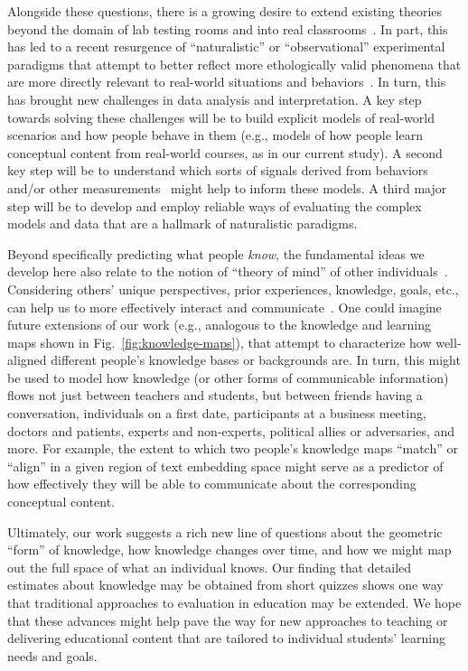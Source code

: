\documentclass[10pt]{article}
\begin{document}
Alongside these questions, there is a growing desire to extend existing
theories beyond the domain of lab testing rooms and into real
classrooms~\citep{Kauf03}. In part, this has led to a recent resurgence of
``naturalistic'' or ``observational'' experimental paradigms that attempt to
better reflect more ethologically valid phenomena that are more directly
relevant to real-world situations and behaviors~\citep{NastEtal20}. In turn,
this has brought new challenges in data analysis and interpretation. A key step
towards solving these challenges will be to build explicit models of real-world
scenarios and how people behave in them (e.g., models of how people learn
conceptual content from real-world courses, as in our current study). A second
key step will be to understand which sorts of signals derived from behaviors
and/or other measurements~\citep[e.g., neurophysiological data; ][]{NguyEtal22,
MeshEtal20, PoulEtal17, BeviEtal19, DikkEtal17} might help to inform these
models. A third major step will be to develop and employ reliable ways of
evaluating the complex models and data that are a hallmark of naturalistic
paradigms.

Beyond specifically predicting what people \textit{know}, the fundamental ideas
we develop here also relate to the notion of ``theory of mind'' of other
individuals~\citep{GoldWinn12, KansEtal15, Melt11}. Considering others' unique
perspectives, prior experiences, knowledge, goals, etc., can help us to more
effectively interact and communicate~\citep{ShaoEtal18, StepBaer06, Ratk18}.
One could imagine future extensions of our work (e.g., analogous to the
knowledge and learning maps shown in Fig.~\ref{fig:knowledge-maps}), that
attempt to characterize how well-aligned different people's knowledge bases or
backgrounds are. In turn, this might be used to model how knowledge (or other
forms of communicable information) flows not just between teachers and
students, but between friends having a conversation, individuals on a first
date, participants at a business meeting, doctors and patients, experts and
non-experts, political allies or adversaries, and more. For example, the extent
to which two people's knowledge maps ``match'' or ``align'' in a given region
of text embedding space might serve as a predictor of how effectively they will
be able to communicate about the corresponding conceptual content.

Ultimately, our work suggests a rich new line of questions about the geometric
``form'' of knowledge, how knowledge changes over time, and how we might map
out the full space of what an individual knows. Our finding that detailed
estimates about knowledge may be obtained from short quizzes shows one way that
traditional approaches to evaluation in education may be extended. We hope that
these advances might help pave the way for new approaches to teaching or
delivering educational content that are tailored to individual students'
learning needs and goals.
\end{document}

